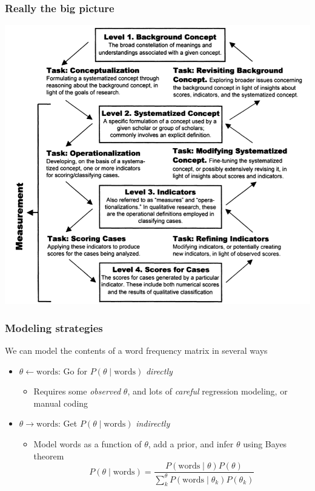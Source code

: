 \documentclass[11pt,compress,professionalfonts]{beamer}
\newcommand{\ita}{\begin{itemize}}
\newcommand{\itm}{\item[]}
\newcommand{\itz}{\end{itemize}}
\begin{document}
\begin{frame}[t]\frametitle{Really the big picture}

\centerline{\includegraphics[scale=.45]{pictures/measurement-validity}}

%
%
%
%
%

\end{frame}
\begin{frame}[t]\frametitle{Modeling strategies}

We can model the contents of a word frequency matrix in several ways
\ita
\itm $\theta \longleftarrow \text{words}$: Go for $P(\theta \mid \text{words})$ \textit{directly}
\ita
\itm Requires some \textit{observed} $\theta$, and lots of \textit{careful} regression modeling, or manual coding
\itz
\itm $\theta \longrightarrow \text{words}$: Get $P(\theta \mid \text{words})$ \textit{indirectly}
\ita
\itm Model words as a function of $\theta$, add a prior, and infer $\theta$ using Bayes theorem
\[
P(\theta \mid \text{words}) = \frac{P(\text{words} \mid \theta)P(\theta)}{\sum^\theta_k P(\text{words} \mid \theta_k)P(\theta_k)}
\]
\itz
\itz


\end{frame}
\end{document}
